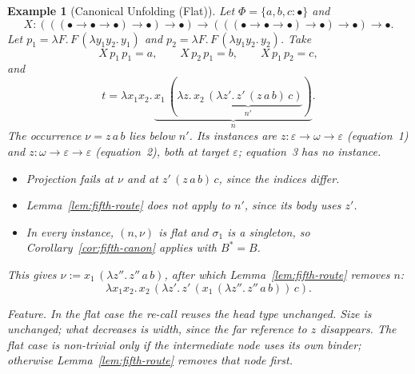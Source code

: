 \documentclass[10pt,a4paper]{article}
\theoremstyle{plain}%
\newtheorem{example}[theorem]{Example}
\begin{document}
\begin{example}[Canonical Unfolding (Flat)]\label{ex:ex-canon}
Let $\Phi = \{a,b,c : \bullet\}$ and
\[
X : (((\bullet\to\bullet\to\bullet)\to\bullet)\to\bullet) \to (((\bullet\to\bullet\to\bullet)\to\bullet)\to\bullet) \to \bullet .
\]
Let $p_1 = \lambda F.\,F\,(\lambda y_1y_2.\,y_1)$ and $p_2 = \lambda F.\,F\,(\lambda y_1y_2.\,y_2)$.
Take
\[
X\,p_1\,p_1 = a,
\qquad
X\,p_2\,p_1 = b,
\qquad
X\,p_1\,p_2 = c,
\]
and
\[
t = \lambda x_1x_2.\,\underbrace{x_1\,(\lambda z.\,\underbrace{x_2\,(\lambda z'.\,z'\,(z\,a\,b)\,c)}_{n'})}_{n}.
\]
The occurrence $\nu = z\,a\,b$ lies below $n'$.
Its instances are $z : \varepsilon \to \omega \to \varepsilon$ (equation~1) and $z : \omega \to \varepsilon \to \varepsilon$ (equation~2), both at target $\varepsilon$; equation~3 has no instance.
\begin{itemize}
\item Projection fails at $\nu$ and at $z'\,(z\,a\,b)\,c$, since the indices differ.
\item Lemma~\ref{lem:fifth-route} does not apply to $n'$, since its body uses $z'$.
\item In every instance, $(n,\nu)$ is flat and $\sigma_1$ is a singleton, so Corollary~\ref{cor:fifth-canon} applies with $B^* = B$.
\end{itemize}
This gives $\nu := x_1\,(\lambda z''.\,z''\,a\,b)$, after which Lemma~\ref{lem:fifth-route} removes $n$:
\[
\lambda x_1x_2.\,x_2\,(\lambda z'.\,z'\,(x_1\,(\lambda z''.\,z''\,a\,b))\,c).
\]

\emph{Feature.}
In the flat case the re-call reuses the head type unchanged.
Size is unchanged; what decreases is width, since the far reference to $z$ disappears.
The flat case is non-trivial only if the intermediate node uses its own binder; otherwise Lemma~\ref{lem:fifth-route} removes that node first.
\end{example}
\end{document}
